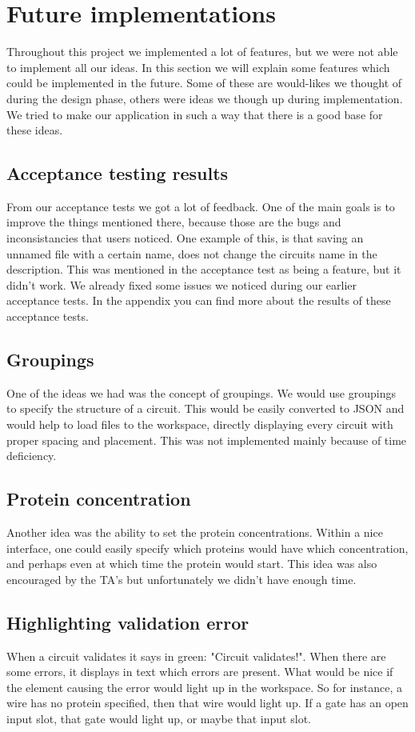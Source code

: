 \section{Future implementations}
Throughout this project we implemented a lot of features, but we were not able to implement all our ideas. In this section we will explain some features which could be implemented in the future. Some of these are would-likes we thought of during the design phase, others were ideas we though up during implementation. We tried to make our application in such a way that there is a good base for these ideas.

\subsection{Acceptance testing results}
From our acceptance tests we got a lot of feedback. One of the main goals is to improve the things mentioned there, because those are the bugs and inconsistancies that users noticed. One example of this, is that saving an unnamed file with a certain name, does not change the circuits name in the description. This was mentioned in the acceptance test as being a feature, but it didn't work. We already fixed some issues we noticed during our earlier acceptance tests. In the appendix you can find more about the results of these acceptance tests.

\subsection{Groupings}
One of the ideas we had was the concept of groupings. We would use groupings to specify the structure of a circuit. This would be easily converted to JSON and would help to load files to the workspace, directly displaying every circuit with proper spacing and placement. This was not implemented mainly because of time deficiency.

\subsection{Protein concentration}
Another idea was the ability to set the protein concentrations. Within a nice interface, one could easily specify which proteins would have which concentration, and perhaps even at which time the protein would start. This idea was also encouraged by the TA's but unfortunately we didn't have enough time.

\subsection{Highlighting validation error}
When a circuit validates it says in green: "Circuit validates!". When there are some errors, it displays in text which errors are present. What would be nice if the element causing the error would light up in the workspace. So for instance, a wire has no protein specified, then that wire would light up.
If a gate has an open input slot, that gate would light up, or maybe that input slot.

